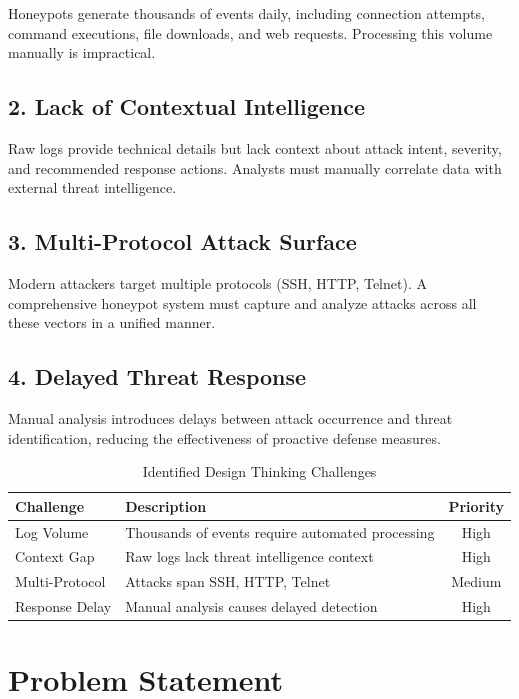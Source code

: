\documentclass[12pt,a4paper]{report}
\begin{document}
Honeypots generate thousands of events daily, including connection attempts, command executions, file downloads, and web requests. Processing this volume manually is impractical.

\subsection*{2. Lack of Contextual Intelligence}

Raw logs provide technical details but lack context about attack intent, severity, and recommended response actions. Analysts must manually correlate data with external threat intelligence.

\subsection*{3. Multi-Protocol Attack Surface}

Modern attackers target multiple protocols (SSH, HTTP, Telnet). A comprehensive honeypot system must capture and analyze attacks across all these vectors in a unified manner.

\subsection*{4. Delayed Threat Response}

Manual analysis introduces delays between attack occurrence and threat identification, reducing the effectiveness of proactive defense measures.

\begin{table}[h]
\centering
\caption{Identified Design Thinking Challenges}
\begin{tabular}{|l|p{8cm}|c|}
\hline
\textbf{Challenge} & \textbf{Description} & \textbf{Priority} \\
\hline
Log Volume & Thousands of events require automated processing & High \\
\hline
Context Gap & Raw logs lack threat intelligence context & High \\
\hline
Multi-Protocol & Attacks span SSH, HTTP, Telnet & Medium \\
\hline
Response Delay & Manual analysis causes delayed detection & High \\
\hline
\end{tabular}
\end{table}

\section{Problem Statement}
\end{document}
